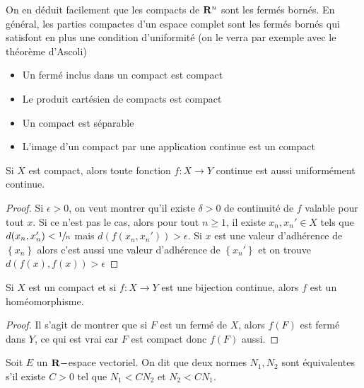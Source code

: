 \begin{rem}
    On en déduit facilement que les compacts de $\mathbf R^n$ sont les fermés bornés. En général, les parties compactes d'un espace complet sont les fermés bornés qui satisfont en plus une condition d'uniformité (on le verra par exemple avec le théorème d'Ascoli)
\end{rem}

\begin{rem}
\begin{itemize}
    \item Un fermé inclus dans un compact est compact
    \item Le produit cartésien de compacts est compact
    \item Un compact est séparable
    \item L'image d'un compact par une application continue est un compact
\end{itemize}
\end{rem}

\begin{thm}
Si $X$ est compact, alors toute fonction  $f:X \longrightarrow Y$ continue est aussi uniformément continue.
\end{thm}

\begin{proof}
    Si $\epsilon>0$, on veut montrer qu'il existe $\delta >0$ de continuité de  $f$ valable pour tout  $x$. Si ce n'est pas le cas, alors pour tout $n\geq 1$, il existe $x_n,x_n' \in  X$ tels que $d(x_n, x_n')<\sfrac1n $ mais  $d(f(x_n, x_n'))>\epsilon$. Si $x$ est une valeur d'adhérence de  $\left\{ x_n \right\} $ alors c'est aussi une valeur d'adhérence de $\left\{ x_n' \right\} $ et on trouve $d(f(x), f(x))>\epsilon$
\end{proof}

\begin{thm}
Si $X$ est un compact et si  $f: X\longrightarrow Y$ est une bijection continue, alors $f$ est un homéomorphisme.
\end{thm}

\begin{proof}
    Il s'agit de montrer que si $F$ est un fermé de  $X$, alors  $f(F)$ est fermé dans  $Y$, ce qui est vrai car $F$ est compact donc  $f(F)$ aussi.
\end{proof}

\begin{dfn}
    Soit $E$ un  $\mathbf R-$espace vectoriel. On dit que deux normes $N_1, N_2$ sont équivalentes s'il existe $C>0$ tel que  $N_1<CN_2$ et  $N_2<CN_1$.
\end{dfn}

